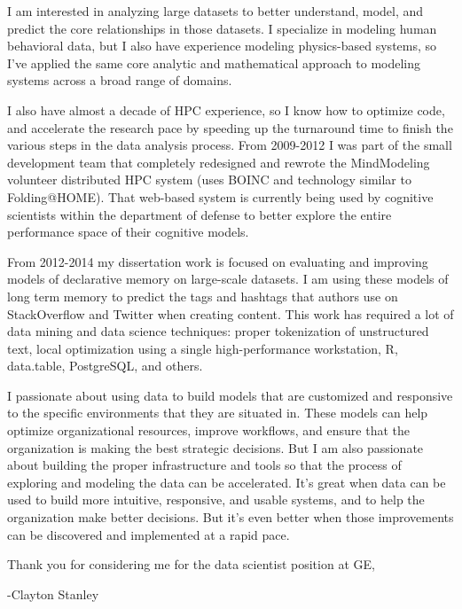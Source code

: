 \documentclass{article}
\begin{document}
I am interested in analyzing large datasets to better understand, model, and predict the core relationships in those datasets.
I specialize in modeling human behavioral data, but I also have experience modeling physics-based systems,
so I've applied the same core analytic and mathematical approach to modeling systems across a broad range of domains.

I also have almost a decade of HPC experience, so I know how to optimize code, and accelerate the research pace by speeding up the turnaround time to finish the various steps in the data analysis process. 
From 2009-2012 I was part of the small development team that completely redesigned and rewrote the MindModeling volunteer distributed HPC system (uses BOINC and technology similar to Folding@HOME).
That web-based system is currently being used by cognitive scientists within the department of defense to better explore the entire performance space of their cognitive models.

From 2012-2014 my dissertation work is focused on evaluating and improving models of declarative memory on large-scale datasets.
I am using these models of long term memory to predict the tags and hashtags that authors use on StackOverflow and Twitter when creating content.
This work has required a lot of data mining and data science techniques: proper tokenization of unstructured text, local optimization using a single high-performance workstation, R, data.table, PostgreSQL, and others.

I passionate about using data to build models that are customized and responsive to the specific environments that they are situated in.
These models can help optimize organizational resources, improve workflows, and ensure that the organization is making the best strategic decisions.
But I am also passionate about building the proper infrastructure and tools so that the process of exploring and modeling the data can be accelerated.
It's great when data can be used to build more intuitive, responsive, and usable systems, and to help the organization make better decisions.
But it's even better when those improvements can be discovered and implemented at a rapid pace.

Thank you for considering me for the data scientist position at GE,

-Clayton Stanley
\end{document}
